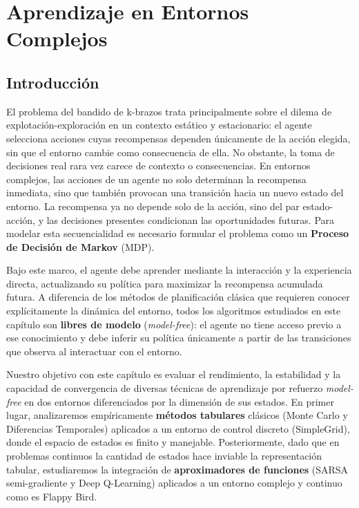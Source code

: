 \chapter{Aprendizaje en Entornos Complejos}

\section{Introducción}

El problema del bandido de k-brazos trata principalmente sobre el dilema de explotación-exploración en un contexto estático y estacionario: el agente selecciona acciones cuyas recompensas dependen únicamente de la acción elegida, sin que el entorno cambie como consecuencia de ella. No obstante, la toma de decisiones real rara vez carece de contexto o consecuencias. En entornos complejos, las acciones de un agente no solo determinan la recompensa inmediata, sino que también provocan una transición hacia un nuevo estado del entorno. La recompensa ya no depende solo de la acción, sino del par estado-acción, y las decisiones presentes condicionan las oportunidades futuras. Para modelar esta secuencialidad es necesario formular el problema como un \textbf{Proceso de Decisión de Markov} (MDP).

Bajo este marco, el agente debe aprender mediante la interacción y la experiencia directa, actualizando su política para maximizar la recompensa acumulada futura. A diferencia de los métodos de planificación clásica que requieren conocer explícitamente la dinámica del entorno, todos los algoritmos estudiados en este capítulo son \textbf{libres de modelo} (\textit{model-free}): el agente no tiene acceso previo a ese conocimiento y debe inferir su política únicamente a partir de las transiciones que observa al interactuar con el entorno.

Nuestro objetivo con este capítulo es evaluar el rendimiento, la estabilidad y la capacidad de convergencia de diversas técnicas de aprendizaje por refuerzo \textit{model-free} en dos entornos diferenciados por la dimensión de sus estados. En primer lugar, analizaremos empíricamente \textbf{métodos tabulares} clásicos (Monte Carlo y Diferencias Temporales) aplicados a un entorno de control discreto (SimpleGrid), donde el espacio de estados es finito y manejable. Posteriormente, dado que en problemas continuos la cantidad de estados hace inviable la representación tabular, estudiaremos la integración de \textbf{aproximadores de funciones} (SARSA semi-gradiente y Deep Q-Learning) aplicados a un entorno complejo y continuo como es Flappy Bird.

